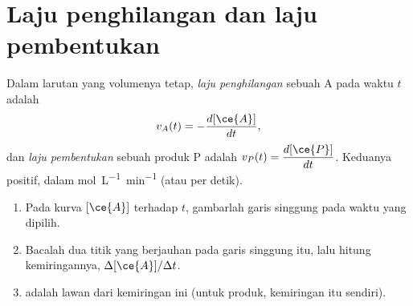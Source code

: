 \section{Laju penghilangan dan laju pembentukan}

\begin{definition}\label{def:g12:reaction-rates:rate}
Dalam larutan yang volumenya tetap, \emph{laju penghilangan}
sebuah  A pada waktu $t$ adalah
\[
  v_A(t) = -\frac{d[\ce{A}]}{dt},
\]
dan \emph{laju pembentukan} sebuah produk P
adalah $v_P(t) = \dfrac{d[\ce{P}]}{dt}$. Keduanya positif, dalam
\si{mol.L^{-1}.min^{-1}} (atau per detik).
\end{definition}


\begin{method}\label{met:g12:reaction-rates:tangent}
\begin{enumerate}
  \item Pada kurva $[\ce{A}]$ terhadap $t$, gambarlah garis singgung
        pada waktu yang dipilih.
  \item Bacalah dua titik yang berjauhan pada garis singgung itu, lalu
        hitung kemiringannya, $\Delta[\ce{A}] / \Delta t$.
  \item {} adalah lawan dari kemiringan ini (untuk
        produk, kemiringan itu sendiri).
\end{enumerate}
\end{method}

